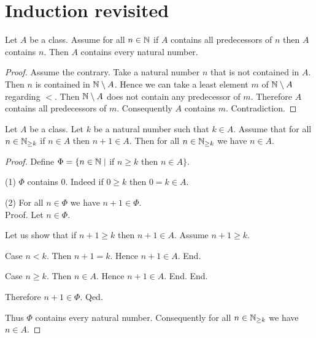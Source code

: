 \documentclass[../arithmetic.tex]{subfiles}
\begin{document}
  \section{Induction revisited}

  \begin{forthel}
    \begin{theorem}
      Let $A$ be a class.
      Assume for all $n \in \mathbb{N}$ if $A$ contains all predecessors of $n$ then
      $A$ contains $n$.
      Then $A$ contains every natural number.
    \end{theorem}
    \begin{proof}
      Assume the contrary.
      Take a natural number $n$ that is not contained in $A$.
      Then $n$ is contained in $\mathbb{N} \setminus A$.
      Hence we can take a least element $m$ of $\mathbb{N} \setminus A$ regarding
      ${<}$.
      Then $\mathbb{N} \setminus A$ does not contain any predecessor of $m$.
      Therefore $A$ contains all predecessors of $m$.
      Consequently $A$ contains $m$.
      Contradiction.
    \end{proof}
  \end{forthel}

  \begin{forthel}
    \begin{theorem}
      Let $A$ be a class.
      Let $k$ be a natural number such that $k \in A$.
      Assume that for all $n \in \mathbb{N}_{\geq k}$ if $n \in A$ then $n + 1 \in A$.
      Then for all $n \in \mathbb{N}_{\geq k}$ we have $n \in A$.
    \end{theorem}
    \begin{proof}
      Define $\Phi = \{n \in \mathbb{N} \mid$ if $n \geq k$ then $n \in A \}$.

      (1) $\Phi$ contains $0$.
      Indeed if $0 \geq k$ then $0 = k \in A$.

      (2) For all $n \in \Phi$ we have $n + 1 \in \Phi$. \\
      Proof.
        Let $n \in \Phi$.

        Let us show that if $n + 1 \geq k$ then $n + 1 \in A$.
          Assume $n + 1 \geq k$.

          Case $n < k$.
            Then $n + 1 = k$.
            Hence $n + 1 \in A$.
          End.

          Case $n \geq k$.
            Then $n \in A$.
            Hence $n + 1 \in A$.
          End.
        End.

        Therefore $n + 1 \in \Phi$.
      Qed.

      Thus $\Phi$ contains every natural number.
      Consequently for all $n \in \mathbb{N}_{\geq k}$ we have $n \in A$.
    \end{proof}
  \end{forthel}
\end{document}
